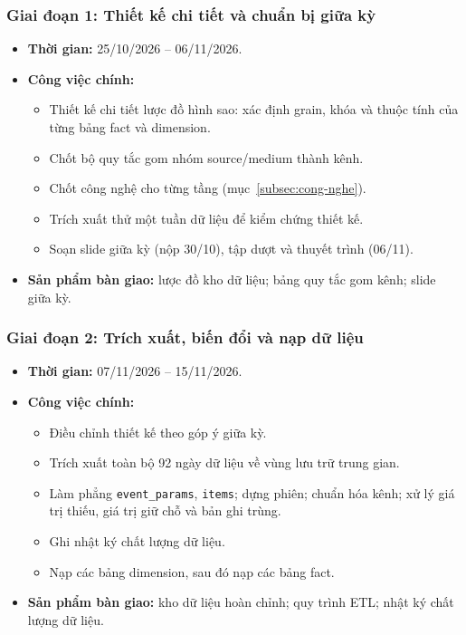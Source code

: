 \subsubsection*{Giai đoạn 1: Thiết kế chi tiết và chuẩn bị giữa kỳ}
\begin{itemize}
    \item \textbf{Thời gian:} 25/10/2026 -- 06/11/2026.
    \item \textbf{Công việc chính:}
    \begin{itemize}
        \item Thiết kế chi tiết lược đồ hình sao: xác định grain, khóa và thuộc tính
              của từng bảng fact và dimension.
        \item Chốt bộ quy tắc gom nhóm source/medium thành kênh.
        \item Chốt công nghệ cho từng tầng (mục~\ref{subsec:cong-nghe}).
        \item Trích xuất thử một tuần dữ liệu để kiểm chứng thiết kế.
        \item Soạn slide giữa kỳ (nộp 30/10), tập dượt và thuyết trình (06/11).
    \end{itemize}
    \item \textbf{Sản phẩm bàn giao:} lược đồ kho dữ liệu; bảng quy tắc gom kênh;
          slide giữa kỳ.
\end{itemize}

\subsubsection*{Giai đoạn 2: Trích xuất, biến đổi và nạp dữ liệu}
\begin{itemize}
    \item \textbf{Thời gian:} 07/11/2026 -- 15/11/2026.
    \item \textbf{Công việc chính:}
    \begin{itemize}
        \item Điều chỉnh thiết kế theo góp ý giữa kỳ.
        \item Trích xuất toàn bộ 92 ngày dữ liệu về vùng lưu trữ trung gian.
        \item Làm phẳng \texttt{event\_params}, \texttt{items}; dựng phiên; chuẩn hóa
              kênh; xử lý giá trị thiếu, giá trị giữ chỗ và bản ghi trùng.
        \item Ghi nhật ký chất lượng dữ liệu.
        \item Nạp các bảng dimension, sau đó nạp các bảng fact.
    \end{itemize}
    \item \textbf{Sản phẩm bàn giao:} kho dữ liệu hoàn chỉnh; quy trình ETL; nhật ký
          chất lượng dữ liệu.
\end{itemize}

